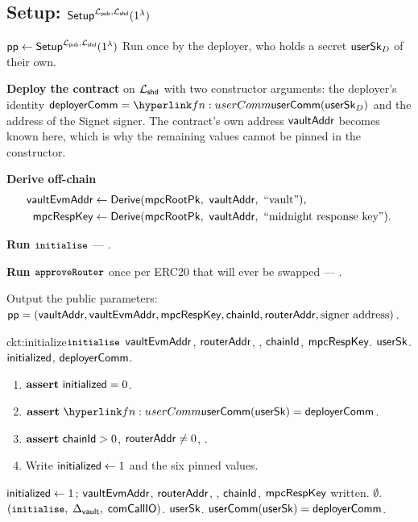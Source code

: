 \subsection{Setup: \texorpdfstring{$\mathsf{Setup}^{\mathcal{L}_{\mathsf{pub}},\mathcal{L}_{\mathsf{shd}}}(1^{\lambda})$}{Setup}}
\label{ssec:setupinst2}

\begin{ProcBox}{$\mathsf{pp} \gets \mathsf{Setup}^{\mathcal{L}_{\mathsf{pub}},\mathcal{L}_{\mathsf{shd}}}(1^{\lambda})$}
\sloppy Run once by the deployer, who holds a secret $\mathsf{userSk}_D$ of their own.
\begin{Steps}
\item \textbf{Deploy the contract} on $\mathcal{L}_{\mathsf{shd}}$ with two constructor arguments: the deployer's
      identity $\deplComm = \lnk{fn:userComm}{\userComm(\usersk_D)}$ and the address of the Signet
      signer. The contract's own address $\mathsf{vaultAddr}$ becomes known here, which is why the
      remaining values cannot be pinned in the constructor.
\item \textbf{Derive off-chain}
      \[\begin{aligned}
        \vaultEvmAddr &\gets \Derive(\mpcRootPk\bc \vaultAddr\bc \keyPathLit),\\
        \mpcRespKey &\gets \Derive(\mpcRootPk\bc \vaultAddr\bc \text{``midnight response key''}).
      \end{aligned}\]
\item \textbf{Run $\texttt{\small initialise}$} --- .
\item \textbf{Run $\texttt{\small approveRouter}$} once per ERC20 that will ever be swapped ---
      .
\end{Steps}
Output the public parameters:\\
$\mathsf{pp} = (\mathsf{vaultAddr}, \mathsf{vaultEvmAddr}, \mathsf{mpcRespKey}, \mathsf{chainId}, \mathsf{routerAddr}, \text{signer address})$.
\end{ProcBox}


\begin{CktBox}{ckt:initialize}{$\texttt{\small initialise}$}
 $\mathsf{vaultEvmAddr}$, $\mathsf{routerAddr}$, \ADDEDINL{$\underAddr$, $\wrapAddr$},
$\mathsf{chainId}$, $\mathsf{mpcRespKey}$.
 $\mathsf{userSk}$.
 $\mathsf{initialized}$, $\mathsf{deployerComm}$.
\begin{enumerate}[nosep,leftmargin=1.7em,topsep=2pt]
\item $\textbf{assert}~ \mathsf{initialized} = 0$.
\item $\assert \lnk{fn:userComm}{\userComm(\usersk)} = \deplComm$.
\item $\textbf{assert}~ \mathsf{chainId} > 0$, \; $\mathsf{routerAddr} \neq 0$,
      .
\item Write $\mathsf{initialized} \gets 1$ and the six pinned values.
\end{enumerate}
\begin{OutList}
\oitem{\Dvault} $\mathsf{initialized} \gets 1$; $\mathsf{vaultEvmAddr}$, $\mathsf{routerAddr}$,
  \ADDEDINL{$\underAddr$, $\wrapAddr$}, $\mathsf{chainId}$, $\mathsf{mpcRespKey}$ written.
\oitem{\Dshd} $\emptyset$.
\oitem{\stmt} $(\texttt{\small initialise},\; \Delta_{\mathsf{vault}},\; \mathsf{comCallIO})$.
\oitem{\wit} $\mathsf{userSk}$.
\oitem{\Rel} $\mathsf{userComm}(\mathsf{userSk}) =\mathsf{deployerComm}$.
\end{OutList}
\end{CktBox}


